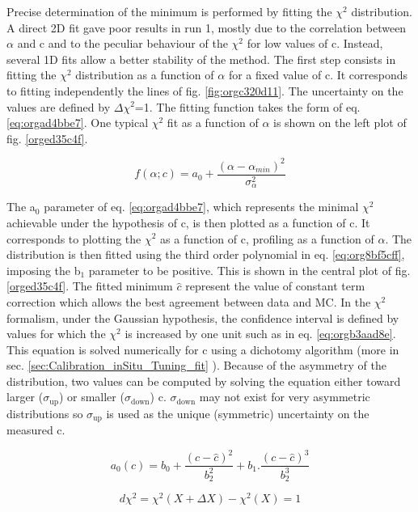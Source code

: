 Precise determination of the minimum is performed by fitting the $\chi^2$ distribution.
A direct 2D fit gave poor results in run 1, mostly due to the correlation between $\alpha$ and c and to the peculiar behaviour of the $\chi^2$ for low values of c.
Instead, several 1D fits allow a better stability of the method.
The first step consists in fitting the $\chi^2$ distribution as a function of $\alpha$ for a fixed value of c.
It corresponds to fitting independently the lines of fig. \ref{fig:orgc320d11}.
The uncertainty on the values are defined by \(\Delta \chi^{\text{2}}\)=1.
The fitting function takes the form of eq. \ref{eq:orgad4bbe7}.
One typical $\chi^2$ fit as a function of $\alpha$ is shown on the left plot of fig. \ref{orged35c4f}.

\begin{equation}
\label{eq:orgad4bbe7}
f(\alpha;c)=a_0+\frac{(\alpha-\alpha_{min})^2}{\sigma_\alpha^2}
\end{equation}


The a\(_{\text{0}}\) parameter of eq. \ref{eq:orgad4bbe7}, which represents the minimal $\chi^2$ achievable under the hypothesis of c, is then plotted as a function of c.
It corresponds to plotting the $\chi^2$ as a function of c, profiling as a function of $\alpha$.
The distribution is then fitted using the third order polynomial in eq. \ref{eq:org8bf5cff}, imposing the b\(_{\text{1}}\) parameter to be positive.
This is shown in the central plot of fig. \ref{orged35c4f}.
The fitted minimum \(\hat{c}\) represent the value of constant term correction which allows the best agreement between data and MC.
In the $\chi^2$ formalism, under the Gaussian hypothesis, the confidence interval is defined by values for which the $\chi^2$ is increased by one unit such as in eq. \ref{eq:orgb3aad8e}.
This equation is solved numerically for c using a dichotomy algorithm (more in sec. \ref{sec:Calibration_inSitu_Tuning_fit} ).
Because of the asymmetry of the distribution, two values can be computed by solving the equation either toward larger (\(\sigma_{\text{up}}\)) or smaller (\(\sigma_{\text{down}}\)) c.
\(\sigma_{\text{down}}\) may not exist for very asymmetric distributions so \(\sigma_{\text{up}}\) is used as the unique (symmetric) uncertainty on the measured c.

\begin{equation}
\label{eq:org8bf5cff}
  a_0(c)=b_0+\frac{(c-\hat{c})^2}{b_2^2} + b_1 . \frac{(c-\hat{c})^3}{b_2^3}
\end{equation}


\begin{equation}
\label{eq:orgb3aad8e}
d\chi^2 = \chi^2(X+\Delta X) - \chi^2(X) = 1
\end{equation}

